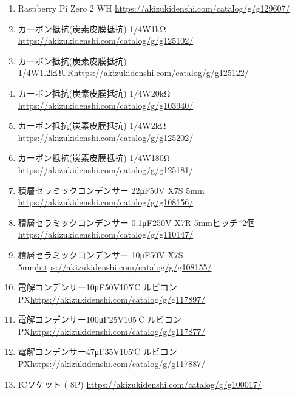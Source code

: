 \documentclass[a4paper,10pt]{jarticle}
\begin{document}
\begin{enumerate}
    \item Raspberry Pi Zero 2 WH \url{https://akizukidenshi.com/catalog/g/g129607/}
    \item カーボン抵抗(炭素皮膜抵抗) 1/4W1kΩ \url{https://akizukidenshi.com/catalog/g/g125102/}
    \item カーボン抵抗(炭素皮膜抵抗) 1/4W1.2kΩ\url{URhttps://akizukidenshi.com/catalog/g/g125122/}
    \item カーボン抵抗(炭素皮膜抵抗) 1/4W20kΩ \url{https://akizukidenshi.com/catalog/g/g103940/}
    \item カーボン抵抗(炭素皮膜抵抗) 1/4W2kΩ \url{https://akizukidenshi.com/catalog/g/g125202/}
    \item カーボン抵抗(炭素皮膜抵抗) 1/4W180Ω \url{https://akizukidenshi.com/catalog/g/g125181/}
    \item 積層セラミックコンデンサー 22μF50V X7S 5mm \url{https://akizukidenshi.com/catalog/g/g108156/}
    \item 積層セラミックコンデンサー 0.1μF250V X7R 5mmピッチ*2個\url{https://akizukidenshi.com/catalog/g/g110147/}
    \item 積層セラミックコンデンサー 10μF50V X7S 5mm\url{https://akizukidenshi.com/catalog/g/g108155/}
    \item 電解コンデンサー10μF50V105℃ ルビコンPX\url{https://akizukidenshi.com/catalog/g/g117897/}
    \item 電解コンデンサー100μF25V105℃ ルビコンPX\url{https://akizukidenshi.com/catalog/g/g117877/}
    \item 電解コンデンサー47μF35V105℃ ルビコンPX\url{https://akizukidenshi.com/catalog/g/g117887/}
    \item ICソケット ( 8P) \url{https://akizukidenshi.com/catalog/g/g100017/}

\end{enumerate}
\end{document}
